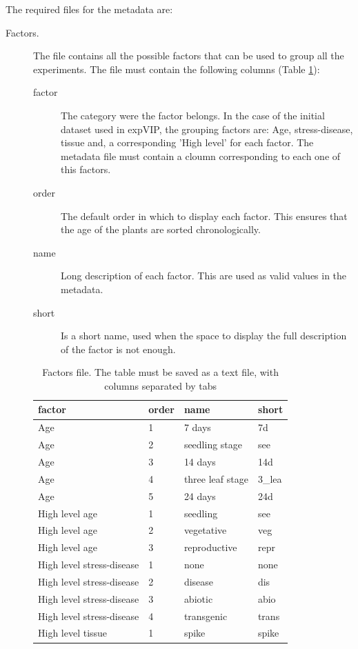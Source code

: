 The required files for the metadata are:
\begin{description}
\item[Factors.] The file contains all the possible factors that can be used to group all the experiments. The file must contain the following columns (Table \ref{tab:exp:factors}):
\begin{description}
\item[factor] The category were the factor belongs. In the case of the initial dataset used in expVIP, the grouping factors are: Age, stress-disease, tissue and, a corresponding 'High level' for each factor. The metadata file must contain a cloumn corresponding to each one of this factors. 
\item[order] The default order in which to display each factor. This ensures that the age of the plants are sorted chronologically. 
\item[name] Long description of each factor. This are used as valid values in the metadata.  
\item[short] Is a short name, used when the space to display the full description of the factor is not enough.
\end{description}
\begin{table}
\centering
\caption[Factors file]{Factors file. The table must be saved as a text file, with columns separated by tabs}
\label{tab:exp:factors}
\begin{tabular}{llll}
\toprule
factor & order & name & short \\
\midrule
Age & 1 & 7 days & 7d \\
Age & 2 & seedling stage & see \\
Age & 3 & 14 days & 14d \\
Age & 4 & three leaf stage & 3\_lea \\
Age & 5 & 24 days & 24d \\
High level age & 1 & seedling & see \\
High level age & 2 & vegetative & veg \\
High level age & 3 & reproductive & repr \\
High level stress-disease & 1 & none & none \\
High level stress-disease & 2 & disease & dis \\
High level stress-disease & 3 & abiotic & abio \\
High level stress-disease & 4 & transgenic & trans \\
High level tissue & 1 & spike & spike \\

\end{tabular}
\end{table}
\end{description}
